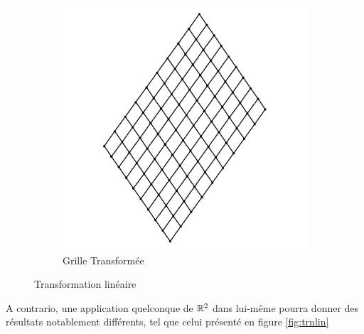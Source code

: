 \begin{figure}[ht]
\begin{subfigure}[b]{0.45\textwidth}
\includegraphics[width=\textwidth]{images/ima2.png}
\caption{Grille Transformée}
\label{fig:trlin_mesh}
\end{subfigure}
\caption{Transformation linéaire}\label{fig:trlin}
\end{figure}
A contrario, une application quelconque de $\mathbb{R}^2$ dans lui-même pourra donner des résultats notablement différents, tel  que celui présenté en figure \ref{fig:trnlin}
